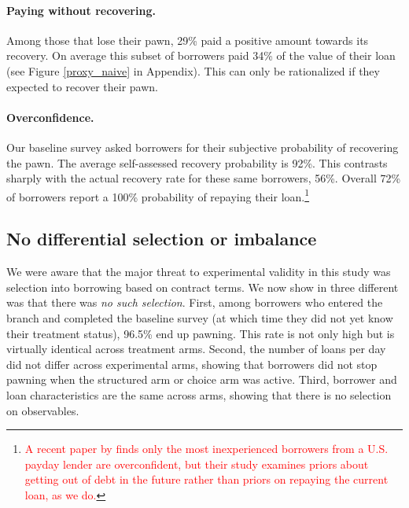 \documentclass[12pt, a4paper, colorinlistoftodos]{article}
\begin{document}
\paragraph*{Paying without recovering.} Among those that lose their pawn, 29\% paid a positive amount towards its recovery. On average this subset of borrowers paid 34\% of the value of their loan (see Figure \ref{proxy_naive} in Appendix). This can only be rationalized if they expected to recover their pawn.

\paragraph*{Overconfidence.} 
Our baseline survey asked borrowers for their subjective probability of recovering the pawn. The average self-assessed recovery probability is 92\%. This contrasts sharply with the actual recovery rate for these same borrowers, 56\%. Overall 72\% of borrowers report a 100\% probability of repaying their loan.\footnote{\textcolor{red}{A recent paper by \cite{predatory2022} finds only the most inexperienced borrowers from a U.S. payday lender are overconfident, but their study examines priors about getting out of debt in the future rather than priors on repaying the current loan, as we do.}}    %

    

\subsection{No differential selection or imbalance}
\label{sec:integrity}


We were aware that the major threat to experimental validity in this study was selection into borrowing based on contract terms. We now show in three different was that there was \emph{no such selection}. First, among borrowers who entered the branch and completed the baseline survey (at which time they did not yet know their treatment status), 96.5\% end up pawning. This rate is not only high but is virtually identical across treatment arms. Second, the number of loans per day did not differ across experimental arms, showing that borrowers did not stop pawning when the structured arm or choice arm was active.  Third, borrower and loan characteristics are the same across arms, showing that there is no selection on observables.
\end{document}

